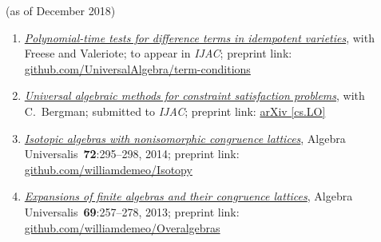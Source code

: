\documentclass[12pt]{article}
\begin{document}
\thispagestyle{empty}

 (as of December 2018)

\vskip5mm
    \begin{enumerate}
    \item \href{https://github.com/UniversalAlgebra/term-conditions/tree/master/ijac}{{\it Polynomial-time tests for difference terms in idempotent varieties}},
      with Freese and Valeriote;
      to appear in {\small {\it IJAC}}; preprint link: \href{https://github.com/UniversalAlgebra/term-conditions/tree/master/DiffTerm}{github.com/UniversalAlgebra/term-conditions}

    \item \href{https://goo.gl/nXC1i9} %
         {{\it Universal algebraic methods for constraint satisfaction problems}},
         with C.~Bergman;
         submitted to {\small {\it IJAC}};
         preprint link: \href{https://arxiv.org/abs/1611.02867}{arXiv [cs.LO]}

    \item \href{https://github.com/williamdemeo/Isotopy}{{\it Isotopic algebras with nonisomorphic congruence lattices}},
    Algebra Universalis~{\bf 72}:295--298, 2014; preprint link: \href{https://github.com/williamdemeo/Isotopy}{github.com/williamdemeo/Isotopy}

    \item \href{https://github.com/williamdemeo/Overalgebras}{{\it Expansions of finite algebras and their congruence lattices}},
    Algebra Universalis~{\bf 69}:257--278, 2013; preprint link: \href{https://github.com/williamdemeo/Overalgebras}{github.com/williamdemeo/Overalgebras}
    \end{enumerate}

    \vskip5mm
\end{document}
